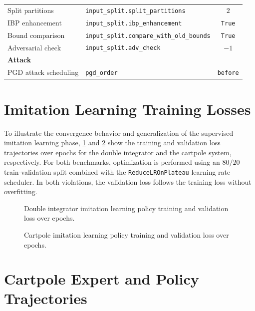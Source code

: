 \begin{table}[htbp]
\begin{tabular}{llc}
        Split partitions & \texttt{input\_split.split\_partitions} & $2$ \\
        IBP enhancement & \texttt{input\_split.ibp\_enhancement} & \texttt{True} \\
        Bound comparison & \texttt{input\_split.compare\_with\_old\_bounds} & \texttt{True} \\
        Adversarial check & \texttt{input\_split.adv\_check} & $-1$ \\
        \midrule
        \multicolumn{3}{l}{\textbf{Attack}} \\
        \midrule
        PGD attack scheduling & \texttt{pgd\_order} & \texttt{before} \\
        \bottomrule
    \end{tabular}
\end{table}



\section{Imitation Learning Training Losses}
\label{app:imitation-loss}
To illustrate the convergence behavior and generalization of the supervised imitation learning phase, 
\cref{fig:di-im-loss} and \cref{fig:cp-im-loss} show the training and validation loss trajectories over epochs 
for the double integrator and the cartpole system, respectively. 
For both benchmarks, optimization is performed using an $80/20$ train-validation split combined with the 
\texttt{ReduceLROnPlateau} learning rate scheduler. In both violations, the validation loss 
follows the training loss without overfitting. 

\begin{figure}[htbp]
    \centering
    
    \caption{Double integrator imitation learning policy training and validation loss over epochs.}
    \label{fig:di-im-loss}
\end{figure}

\begin{figure}[htbp]
    \centering
    
    \caption{Cartpole imitation learning policy training and validation loss over epochs.}
    \label{fig:cp-im-loss}
\end{figure}



\section{Cartpole Expert and Policy Trajectories}
\label{app:cartpole-trajectories}

